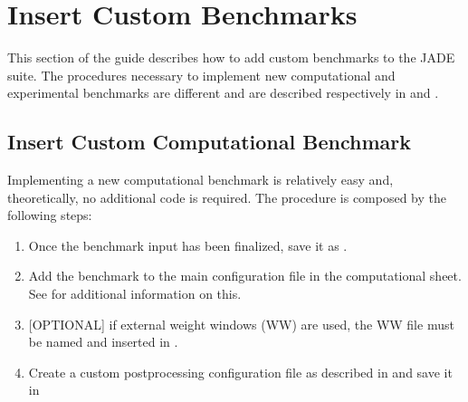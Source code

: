 \documentclass[letterpaper,10pt,english]{sphinxmanual}
\begin{document}
\chapter{Insert Custom Benchmarks}
\label{\detokenize{dev/insertbenchmarks:insert-custom-benchmarks}}\label{\detokenize{dev/insertbenchmarks::doc}}
This section of the guide describes how to add custom benchmarks to the JADE suite. The procedures
necessary to implement new computational and experimental benchmarks are different and are
described respectively in {\hyperref[\detokenize{dev/insertbenchmarks:customcompbench}]{}} and {\hyperref[\detokenize{dev/insertbenchmarks:customexpbench}]{}}.


\section{Insert Custom Computational Benchmark}
\label{\detokenize{dev/insertbenchmarks:insert-custom-computational-benchmark}}\label{\detokenize{dev/insertbenchmarks:customcompbench}}
Implementing a new computational benchmark is relatively easy and, theoretically, no additional
code is required. The procedure is composed by the following steps:
\begin{enumerate}
%
\item {} 
Once the benchmark input has been finalized, save it as .

\item {} 
Add the benchmark to the main configuration file in the computational sheet. See {\hyperref[\detokenize{usage/configuration:compsheet}]{}}
for additional information on this.

\item {} 
{[}OPTIONAL{]} if external weight windows (WW) are used, the WW file must be named  and inserted in
.

\item {} 
Create a custom post\sphinxhyphen{}processing configuration file as described in {\hyperref[\detokenize{usage/configuration:ppconf}]{}} and save it in

\end{enumerate}
\end{document}
